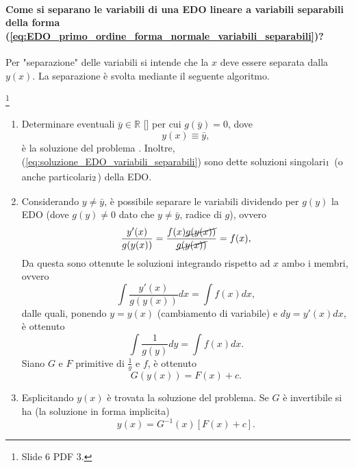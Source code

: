 \paragraph{Come si separano le variabili di una EDO lineare a variabili separabili della forma (\ref{eq:EDO_primo_ordine_forma_normale_variabili_separabili})?} Per "separazione" delle variabili si intende che la $x$ deve essere separata dalla $y(x)$. La separazione è svolta mediante il seguente algoritmo.

\begin{alg}\label{alg:separazione_variabili}
	\footnote{Slide 6 PDF 3.}\\
	\begin{enumerate}
		\item Determinare eventuali $\bar y\in\mathbb R$ [\footnotemark] per cui $g(\bar y)=0$, dove
		\begin{equation}\label{eq:soluzione_EDO_variabili_separabili}
			y(x)\equiv \bar y,
		\end{equation}
		è la soluzione del problema \footnotemark. Inoltre, (\ref{eq:soluzione_EDO_variabili_separabili}) sono dette soluzioni singolari$_{\footnotemark}$ (o anche particolari$_{\footnotemark}$) della EDO.
		\item Considerando $y\neq\bar y$, è possibile separare le variabili dividendo per $g(y)$ la EDO (dove $g(y)\neq 0$ dato che $y\neq \bar y$, radice di $g$), ovvero
		\begin{equation*}
			\frac{y'(x)}{g(y(x))} = \frac{f(x) \cancel{g(y(x))}}{\cancel{g(y(x))}} = f(x),
		\end{equation*}
		Da questa sono ottenute le soluzioni integrando rispetto ad $x$ ambo i membri, ovvero
		\begin{equation*}
			\int\frac{y'(x)}{g(y(x))}dx=\int f(x)dx,
		\end{equation*}
		dalle quali, ponendo $y=y(x)$ (cambiamento di variabile) e $dy = y'(x)dx$, è ottenuto
		\begin{equation*}
			\int \frac{1}{g(y)}dy = \int f(x)dx.
		\end{equation*}
		Siano $G$ e $F$ primitive di $\frac{1}{g}$ e $f$, è ottenuto
		\begin{equation*}
			G(y(x)) = F(x) + c.
		\end{equation*}
		\item Esplicitando $y(x)$ è trovata la soluzione del problema. Se $G$ è invertibile si ha (la soluzione in forma implicita)
		\begin{equation*}
			y(x) = G^{-1}(x) [F(x) + c].
		\end{equation*}
	\end{enumerate}
\end{alg}

